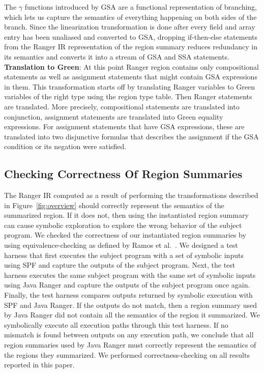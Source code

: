 %
The $\gamma$ functions introduced by GSA are a functional representation of branching, which lets us
capture the semantics of everything happening on both sides of the branch.
%
Since the linearization transformation is done after every field and array entry has been unaliased and converted to
GSA, dropping if-then-else statements from the Ranger IR representation of the region summary reduces redundancy in its
semantics and converts it into a stream of GSA and SSA statements.\\
\textbf{Translation to Green}:
%
At this point Ranger region contains only compositional statements as well as assignment statements that might contain GSA expressions in them.
%
This transformation starts off by translating Ranger variables to Green variables of the right type using the region type table.
%
Then Ranger statements are translated. More precisely, compositional statements are translated into conjunction, assignment statements are translated into Green equality expressions.
%
For assignment statements that have GSA expressions, these are translated into two disjunctive formulas that describes the assignment if the GSA condition or its negation were satisfied. 

\subsection{Checking Correctness Of Region Summaries}
The Ranger IR computed as a result of performing the transformations described in Figure~\ref{fig:overview} should
correctly represent the semantics of the summarized region.
%
If it does not, then using the instantiated region summary can cause symbolic exploration to explore the wrong behavior
of the subject program.
%
We checked the correctness of our instantiated region summaries by using equivalence-checking as defined by Ramos et al.~\cite{ramos}.
%
We designed a test harness that first executes the subject program with a set of symbolic inputs using SPF and
capture the outputs of the subject program.
%
Next, the test harness executes the same subject program with the same set of symbolic inputs using Java Ranger and
capture the outputs of the subject program once again.
%
Finally, the test harness compares outputs returned by symbolic execution with SPF and Java Ranger.
%
If the outputs do not match, then a region summary used by Java Ranger did not contain all the semantics
of the region it summarized.
%
We symbolically execute all execution paths through this test harness.
%
If no mismatch is found between outputs on any execution path, we conclude that all region summaries used by Java Ranger
must correctly represent the semantics of the regions they summarized.
%
We performed correctness-checking on all results reported in this paper.
